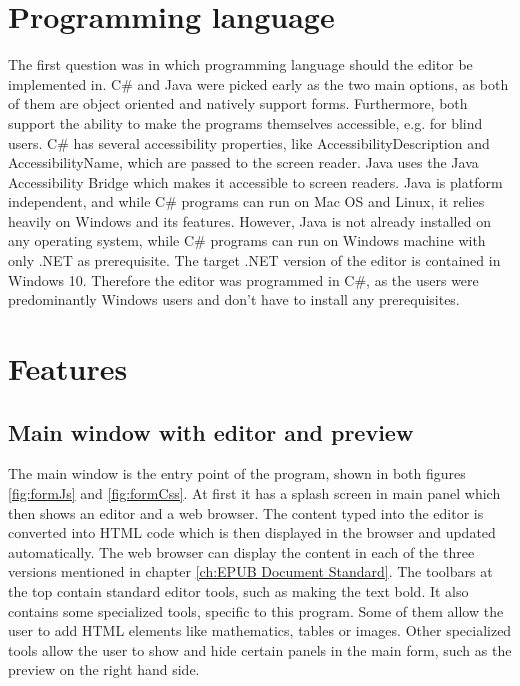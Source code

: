 \section{Programming language}

The first question was in which programming language should the editor be implemented in. C\# and Java were picked early as the two main options, as both of them are object oriented and natively support forms. Furthermore, both support the ability to make the programs themselves accessible, e.g. for blind users. C\# has several accessibility properties, like AccessibilityDescription and AccessibilityName, which are passed to the screen reader. Java uses the Java Accessibility Bridge which makes it accessible to screen readers. Java is platform independent, and while C\# programs can run on Mac OS and Linux, it relies heavily on Windows and its features. However, Java is not already installed on any operating system, while C\# programs can run on Windows machine with only .NET as prerequisite. The target .NET version of the editor is contained in Windows 10. Therefore the editor was programmed in C\#, as the users were predominantly Windows users and don't have to install any prerequisites.

\section{Features}

\subsection{Main window with editor and preview}

The main window is the entry point of the program, shown in both figures \ref{fig:formJs} and \ref{fig:formCss}. At first it has a splash screen in main panel which then shows an editor and a web browser. The content typed into the editor is converted into HTML code which is then displayed in the browser and updated automatically. The web browser can display the content in each of the three versions mentioned in chapter \ref{ch:EPUB Document Standard}. The toolbars at the top contain standard editor tools, such as making the text bold. It also contains some specialized tools, specific to this program. Some of them allow the user to add HTML elements like mathematics, tables or images. Other specialized tools allow the user to show and hide certain panels in the main form, such as the preview on the right hand side. 

